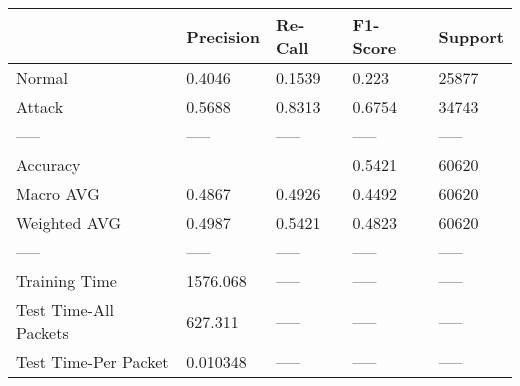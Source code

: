\begin{tabular}{lllll}
\toprule
{} & Precision & Re-Call & F1-Score & Support \\
\midrule
Normal                &    0.4046 &  0.1539 &    0.223 &   25877 \\
Attack                &    0.5688 &  0.8313 &   0.6754 &   34743 \\
-----                 &     ----- &   ----- &    ----- &   ----- \\
Accuracy              &           &         &   0.5421 &   60620 \\
Macro AVG             &    0.4867 &  0.4926 &   0.4492 &   60620 \\
Weighted AVG          &    0.4987 &  0.5421 &   0.4823 &   60620 \\
-----                 &     ----- &   ----- &    ----- &   ----- \\
Training Time         &  1576.068 &   ----- &    ----- &   ----- \\
Test Time-All Packets &   627.311 &   ----- &    ----- &   ----- \\
Test Time-Per Packet  &  0.010348 &   ----- &    ----- &   ----- \\
\bottomrule
\end{tabular}
